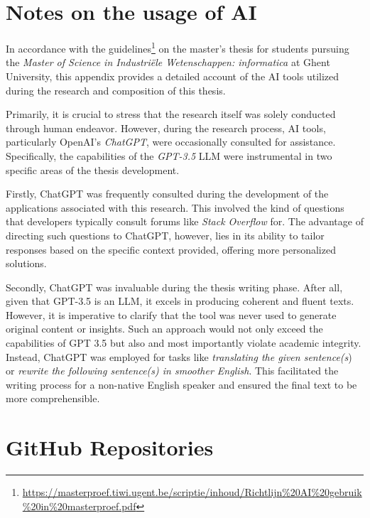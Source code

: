 \appendix
\renewcommand{\thesection}{\Alph{section}}
\setcounter{section}{0}

\begin{appendices}

\section{Notes on the usage of AI}
\label{app:ai}

In accordance with the guidelines\footnote{\url{https://masterproef.tiwi.ugent.be/scriptie/inhoud/Richtlijn\%20AI\%20gebruik\%20in\%20masterproef.pdf}} on the master's thesis for students pursuing the \textit{Master of Science in Industriële Wetenschappen: informatica} at Ghent University, this appendix provides a detailed account of the AI tools utilized during the research and composition of this thesis.

Primarily, it is crucial to stress that the research itself was solely conducted through human endeavor. However, during the research process, AI tools, particularly OpenAI's \textit{ChatGPT}, were occasionally consulted for assistance. Specifically, the capabilities of the \textit{GPT-3.5} LLM were instrumental in two specific areas of the thesis development.

Firstly, ChatGPT was frequently consulted during the development of the applications associated with this research. This involved the kind of questions that developers typically consult forums like \textit{Stack Overflow} for. The advantage of directing such questions to ChatGPT, however, lies in its ability to tailor responses based on the specific context provided, offering more personalized solutions.

Secondly, ChatGPT was invaluable during the thesis writing phase. After all, given that GPT-3.5 is an LLM, it excels in producing coherent and fluent texts. However, it is imperative to clarify that the tool was never used to generate original content or insights. Such an approach would not only exceed the capabilities of GPT 3.5 but also and most importantly violate academic integrity. Instead, ChatGPT was employed for tasks like \textit{translating the given sentence(s}) or \textit{rewrite the following sentence(s) in smoother English}. This facilitated the writing process for a non-native English speaker and ensured the final text to be more comprehensible.

\newpage
\section{GitHub Repositories}


\end{appendices}
